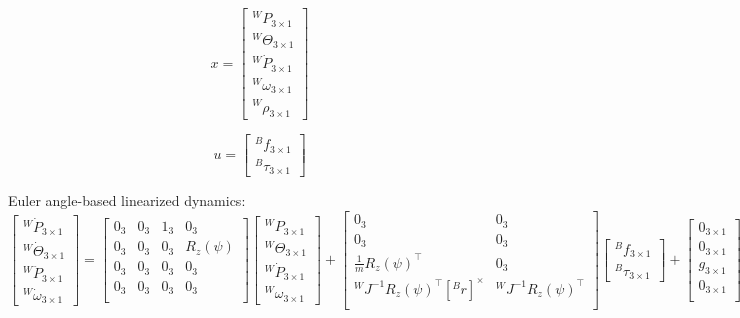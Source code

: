\documentclass{article}
\begin{document}
\begin{equation}
	x = \begin{bmatrix}
	{}^W P_{3 \times 1}\\
	{}^W\Theta_{3 \times 1}\\
	{}^W\dot{P}_{3 \times 1}\\
	{}^W\omega_{3 \times 1}\\
	{}^W \rho_{3 \times 1}
	\end{bmatrix}
\end{equation}

\begin{equation}
	u = \begin{bmatrix}
	{}^B f_{3 \times 1} \\
	{}^B\tau_{3 \times 1}
	\end{bmatrix}
\end{equation}

Euler angle-based linearized dynamics:
\begin{equation}
	\begin{bmatrix}
	{}^W \dot{P}_{3 \times 1}\\
	{}^W \dot{\Theta}_{3 \times 1}\\
	{}^W \ddot{P}_{3 \times 1}\\
	{}^W \dot{\omega}_{3 \times 1}
	\end{bmatrix} = 
	\begin{bmatrix}
		0_3 & 0_3 & 1_3 & 0_3  \\
		0_3 & 0_3 & 0_3 & R_z(\psi)  \\
		0_3 & 0_3 & 0_3 & 0_3 \\
		0_3 & 0_3 & 0_3 & 0_3 \\
	\end{bmatrix}
	\begin{bmatrix}
	{}^W P_{3 \times 1}\\
	{}^W \Theta_{3 \times 1}\\
	{}^W \dot{P}_{3 \times 1}\\
	{}^W {\omega}_{3 \times 1}
	\end{bmatrix} + 
	\begin{bmatrix}
		0_3 & 0_3 \\
		0_3 & 0_3 \\
		\frac{1}{m}R_z(\psi)^\top & 0_3 \\
		{}^WJ^{-1} R_z(\psi)^\top [{}^Br]^\times & {}^WJ^{-1} R_z(\psi)^\top \\
	\end{bmatrix}
	\begin{bmatrix}
	{}^B f_{3 \times 1} \\
	{}^B\tau_{3 \times 1}
	\end{bmatrix} +
	\begin{bmatrix}
	0_{3\times 1} \\
	0_{3\times 1} \\
	g_{3\times 1} \\
	0_{3\times 1} \\
	\end{bmatrix}
\end{equation}
\end{document}
